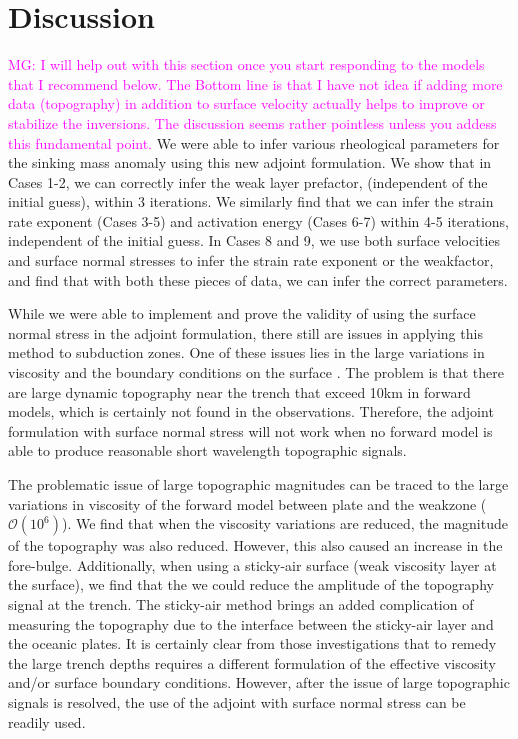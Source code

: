 \documentclass[12pt]{article}
\newcommand{\mgnote}[1]{\textcolor{magenta}{MG: #1}}
\begin{document}
\section*{Discussion}

\mgnote{I will help out with this section once you start responding to the models that I recommend below. The Bottom line is that I have not idea if adding more data (topography) in addition to surface velocity actually helps to improve or stabilize the inversions. The discussion seems rather pointless unless you addess this fundamental point.}
We were able to infer various rheological parameters for the sinking mass anomaly using this new adjoint formulation. We show that in Cases 1-2, we can correctly infer the weak layer prefactor, (independent of the initial guess), within 3 iterations. We similarly find that we can infer the strain rate exponent (Cases 3-5) and activation energy (Cases 6-7) within 4-5 iterations, independent of the initial guess.  In Cases 8 and 9, we use both surface velocities and surface normal stresses to infer the strain rate exponent or the weakfactor, and find that with both these pieces of data, we can infer the correct parameters.

 While we were able to implement and prove the validity of using the surface normal stress in the adjoint formulation, there still are issues in applying this method to subduction zones. One of these issues lies in the large variations in viscosity and the boundary conditions on the surface \citep{crameri2017dynamical}. The problem is that there are large dynamic topography near the trench that exceed 10km in forward models, which is certainly not found in the observations. Therefore, the adjoint formulation with surface normal stress will not work when no forward model is able to produce reasonable short wavelength topographic signals. 
 
 
  The problematic issue of large topographic magnitudes can be traced to the large variations in viscosity of the forward model between plate and the weakzone ($\mathcal{O}(10^6)$). We find that when the viscosity variations are reduced, the magnitude of the topography was also reduced. However, this also caused an increase in the fore-bulge. Additionally, when using a sticky-air surface (weak viscosity layer at the surface), we find that the we could reduce the amplitude of the topography signal at the trench. The sticky-air method brings an added complication of measuring the topography due to the interface between the sticky-air layer and the oceanic plates. It is certainly clear from those investigations that to remedy the large trench depths requires a different formulation of the effective viscosity and/or surface boundary conditions. However, after the issue of large topographic signals is resolved, the use of the adjoint with surface normal stress can be readily used.
\end{document}
